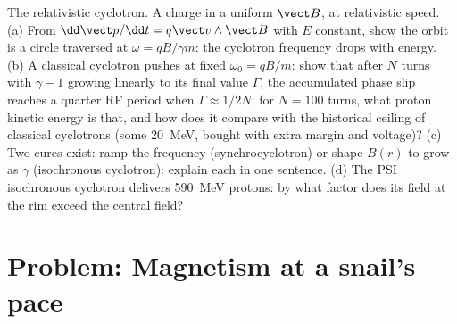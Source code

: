 \begin{exercise}[$\star\star\star$]\label{exo:b3:covariant-electromagnetism:12}
The relativistic cyclotron. A charge in a uniform $\vect B$, at
relativistic speed. (a) From $\dd\vect p/\dd t = q\vect v\wedge\vect
B$ with $E$ constant, show the orbit is a circle traversed at
$\omega = qB/\gamma m$: the cyclotron frequency drops with energy.
(b) A classical cyclotron pushes at fixed $\omega_0 = qB/m$: show
that after $N$ turns with $\gamma - 1$ growing linearly to its final
value $\Gamma$, the accumulated phase slip reaches a quarter RF
period when $\Gamma \approx 1/2N$; for $N = 100$ turns, what proton
kinetic energy is that, and how does it compare with the historical
ceiling of classical cyclotrons (some \qty{20}{MeV}, bought with
extra margin and voltage)? (c) Two
cures exist: ramp the frequency (synchrocyclotron) or shape $B(r)$ to
grow as $\gamma$ (isochronous cyclotron): explain each in one
sentence. (d) The PSI isochronous cyclotron delivers \qty{590}{MeV}
protons: by what factor does its field at the rim exceed the central
field?
\end{exercise}

\section{Problem: Magnetism at a snail's pace}

